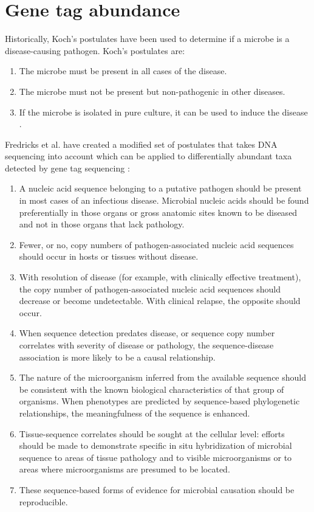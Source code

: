 \section{Gene tag abundance}
Historically, Koch’s postulates have been used to determine if a microbe is a disease-causing pathogen. Koch's postulates are:

\begin{enumerate}
\item The microbe must be present in all cases of the disease.
\item The microbe must not be present but non-pathogenic in other diseases.
\item If the microbe is isolated in pure culture, it can be used to induce the disease \cite{koch1891uber}.
\end{enumerate}

Fredricks et al. have created a modified set of postulates that takes DNA sequencing into account which can be applied to differentially abundant taxa detected by gene tag sequencing \cite{fredericks1996sequence}:

\begin{enumerate}
\item A nucleic acid sequence belonging to a putative pathogen should be present in most cases of an infectious disease. Microbial nucleic acids should be found preferentially in those organs or gross anatomic sites known to be diseased and not in those organs that lack pathology.
\item Fewer, or no, copy numbers of pathogen-associated nucleic acid sequences should occur in hosts or tissues without disease.
\item With resolution of disease (for example, with clinically effective treatment), the copy number of pathogen-associated nucleic acid sequences should decrease or become undetectable. With clinical relapse, the opposite should occur.
\item When sequence detection predates disease, or sequence copy number correlates with severity of disease or pathology, the sequence-disease association is more likely to be a causal relationship.
\item The nature of the microorganism inferred from the available sequence should be consistent with the known biological characteristics of that group of organisms. When phenotypes are predicted by sequence-based phylogenetic relationships, the meaningfulness of the sequence is enhanced.
\item Tissue-sequence correlates should be sought at the cellular level: efforts should be made to demonstrate specific in situ hybridization of microbial sequence to areas of tissue pathology and to visible microorganisms or to areas where microorganisms are presumed to be located.
\item These sequence-based forms of evidence for microbial causation should be reproducible.
\end{enumerate}

